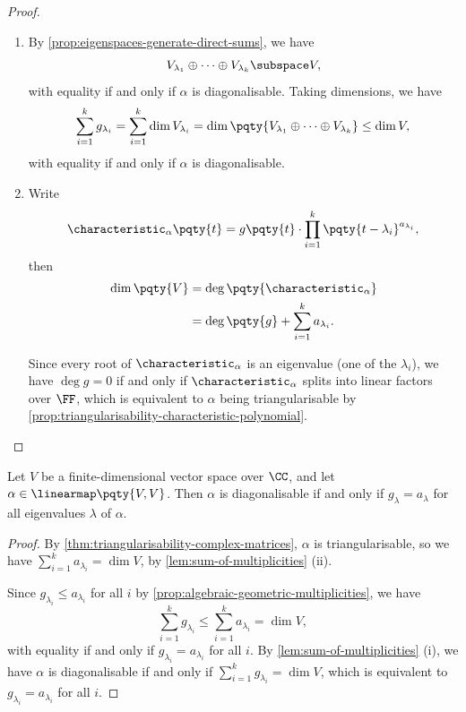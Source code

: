 \begin{proof}
    \begin{enumerate}[label=(\roman*)]
        \item By \autoref{prop:eigenspaces-generate-direct-sums}, we have
        \[
            V_{\lambda_1} \oplus \cdots \oplus V_{\lambda_k} \subspace V,
        \]
        with equality if and only if \(\alpha\) is diagonalisable. Taking dimensions, we have
        \[
            \sum_{i = 1}^{k} g_{\lambda_i} = \sum_{i = 1}^{k} \dim V_{\lambda_i} = \dim\pqty{V_{\lambda_1} \oplus \cdots \oplus V_{\lambda_k}} \leq \dim V,
        \]
        with equality if and only if \(\alpha\) is diagonalisable.

        \item Write
        \[
            \characteristic_\alpha \pqty{t} = g\pqty{t} \cdot \prod_{i = 1}^{k} \pqty{t - \lambda_i}^{a_{\lambda_i}},
        \]
        then
        \begin{align*}
            \dim\pqty{V} &= \deg\pqty{\characteristic_\alpha} \\
            &= \deg\pqty{g} + \sum_{i = 1}^{k} a_{\lambda_i}.
        \end{align*}

        Since every root of \(\characteristic_{\alpha}\) is an eigenvalue (one of the \(\lambda_i\)), we have \(\deg g = 0\) if and only if \(\characteristic_{\alpha}\) splits into linear factors over \(\FF\), which is equivalent to \(\alpha\) being triangularisable by \autoref{prop:triangularisability-characteristic-polynomial}.
    \end{enumerate}
\end{proof}

\begin{proposition}
    \label{prop:diagonalisability-multiplicities-complex-matrices}%
    Let \(V\) be a finite-dimensional vector space over \(\CC\), and let \(\alpha \in \linearmap\pqty{V, V}\). Then \(\alpha\) is diagonalisable if and only if \(g_{\lambda} = a_{\lambda}\) for all eigenvalues \(\lambda\) of \(\alpha\).
\end{proposition}

\begin{proof}
    By \autoref{thm:triangularisability-complex-matrices}, \(\alpha\) is triangularisable, so we have \(\sum_{i = 1}^{k} a_{\lambda_i} = \dim V\), by \autoref{lem:sum-of-multiplicities} (ii).

    Since \(g_{\lambda_i} \leq a_{\lambda_i}\) for all \(i\) by \autoref{prop:algebraic-geometric-multiplicities}, we have
    \[
        \sum_{i = 1}^{k} g_{\lambda_i} \leq \sum_{i = 1}^{k} a_{\lambda_i} = \dim V,
    \]
    with equality if and only if \(g_{\lambda_i} = a_{\lambda_i}\) for all \(i\). By \autoref{lem:sum-of-multiplicities} (i), we have \(\alpha\) is diagonalisable if and only if \(\sum_{i = 1}^{k} g_{\lambda_i} = \dim V\), which is equivalent to \(g_{\lambda_i} = a_{\lambda_i}\) for all \(i\).
\end{proof}

